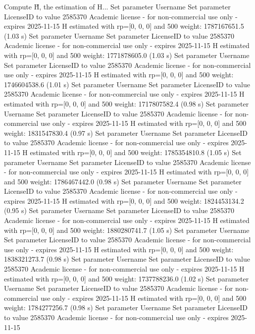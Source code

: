 Compute H̃, the estimation of H...
Set parameter Username
Set parameter LicenseID to value 2585370
Academic license - for non-commercial use only - expires 2025-11-15
  H estimated with rp=[0, 0, 0] and 500 weight:  1787167651.5  (1.03 s)
Set parameter Username
Set parameter LicenseID to value 2585370
Academic license - for non-commercial use only - expires 2025-11-15
  H estimated with rp=[0, 0, 0] and 500 weight:  1771878605.0  (1.03 s)
Set parameter Username
Set parameter LicenseID to value 2585370
Academic license - for non-commercial use only - expires 2025-11-15
  H estimated with rp=[0, 0, 0] and 500 weight:  1746604538.6  (1.01 s)
Set parameter Username
Set parameter LicenseID to value 2585370
Academic license - for non-commercial use only - expires 2025-11-15
  H estimated with rp=[0, 0, 0] and 500 weight:  1717807582.4  (0.98 s)
Set parameter Username
Set parameter LicenseID to value 2585370
Academic license - for non-commercial use only - expires 2025-11-15
  H estimated with rp=[0, 0, 0] and 500 weight:  1831547830.4  (0.97 s)
Set parameter Username
Set parameter LicenseID to value 2585370
Academic license - for non-commercial use only - expires 2025-11-15
  H estimated with rp=[0, 0, 0] and 500 weight:  1785354810.8  (1.05 s)
Set parameter Username
Set parameter LicenseID to value 2585370
Academic license - for non-commercial use only - expires 2025-11-15
  H estimated with rp=[0, 0, 0] and 500 weight:  1786467442.0  (0.98 s)
Set parameter Username
Set parameter LicenseID to value 2585370
Academic license - for non-commercial use only - expires 2025-11-15
  H estimated with rp=[0, 0, 0] and 500 weight:  1824453134.2  (0.95 s)
Set parameter Username
Set parameter LicenseID to value 2585370
Academic license - for non-commercial use only - expires 2025-11-15
  H estimated with rp=[0, 0, 0] and 500 weight:  1880280741.7  (1.05 s)
Set parameter Username
Set parameter LicenseID to value 2585370
Academic license - for non-commercial use only - expires 2025-11-15
  H estimated with rp=[0, 0, 0] and 500 weight:  1838321273.7  (0.98 s)
Set parameter Username
Set parameter LicenseID to value 2585370
Academic license - for non-commercial use only - expires 2025-11-15
  H estimated with rp=[0, 0, 0] and 500 weight:  1737788236.0  (1.02 s)
Set parameter Username
Set parameter LicenseID to value 2585370
Academic license - for non-commercial use only - expires 2025-11-15
  H estimated with rp=[0, 0, 0] and 500 weight:  1784277256.7  (0.98 s)
Set parameter Username
Set parameter LicenseID to value 2585370
Academic license - for non-commercial use only - expires 2025-11-15

